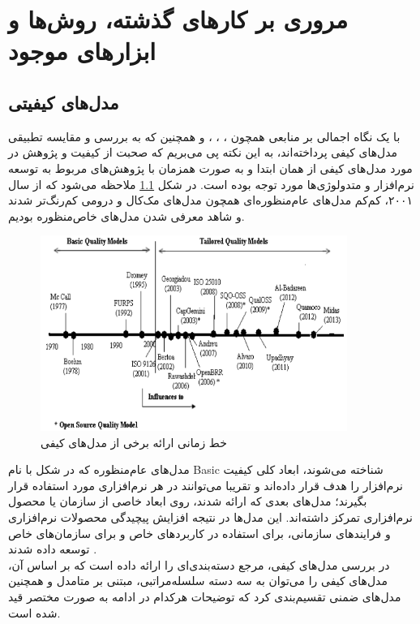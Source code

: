 \chapter{مروری بر کارهای گذشته، روش‌ها و ابزارهای موجود}
\section{مدل‌های کیفیتی}
با یک نگاه اجمالی بر منابعی همچون
\cite{wagner_software_2013}،
\cite{seffah_usability_2006}، 
\cite{pressman_software_2015}،
\cite{p._miguel_review_2014}
و همچنین
\cite{sommerville_software_2016}
که به بررسی و مقایسه تطبیقی مدل‌های کیفی پرداخته‌اند، به این نکته پی می‌بریم که صحبت از کیفیت و پژوهش در مورد مدل‌های کیفی از همان ابتدا و به صورت همزمان با پژوهش‌های مربوط به توسعه نرم‌افزار و متدولوژی‌ها مورد توجه بوده است.
در شکل
\ref{fig:qmodels}
ملاحظه می‌شود که از سال ۲۰۰۱، کم‌کم مدل‌های عام‌منظوره‌ای همچون مدل‌های مک‌کال و درومی
کم‌رنگ‌تر شدند و شاهد معرفی شدن مدل‌های خاص‌منظوره بودیم.
\begin{figure}[H]
	\centering\includegraphics[width=10cm]{Resources/qmodels.PNG}
	\caption{خط زمانی ارائه برخی از مدل‌های کیفی
		\cite{p._miguel_review_2014}
	}
	\label{fig:qmodels}
\end{figure}
مدل‌های عام‌منظوره که در شکل با نام Basic شناخته می‌شوند، ابعاد کلی کیفیت نرم‌افزار را هدف قرار داده‌اند و تقریبا می‌توانند در هر نرم‌افزاری مورد استفاده قرار بگیرند؛ مدل‌های بعدی که ارائه شدند، روی ابعاد خاصی از سازمان یا محصول نرم‌افزاری تمرکز داشته‌اند. این مدل‌ها در نتیجه افزایش پیچیدگی محصولات نرم‌افزاری و فرایندهای سازمانی، برای استفاده در کاربردهای خاص و برای سازمان‌های خاص توسعه داده شدند
\cite{p._miguel_review_2014}.\\
در بررسی مدل‌های کیفی، مرجع
\cite{wagner_software_2013}
دسته‌بندی‌ای را ارائه داده است که بر اساس آن، مدل‌های کیفی را می‌توان به سه دسته سلسله‌مراتبی، مبتنی بر متامدل و همچنین مدل‌های ضمنی تقسیم‌بندی کرد که توضیحات هرکدام در ادامه به صورت مختصر قید شده است.
